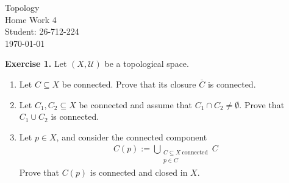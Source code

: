 \documentclass[12pt]{article}
\begin{document}
\begin{titlepage}
\centering
\vspace*{\fill} %
{\Huge Topology} \\[0.5cm] %
{\Huge Home Work 4}\\[1.5cm] %
{\Large Student: 26-712-224}\\[0.5cm] %
{\Large \today} %
\vspace*{\fill}
\end{titlepage}

\newpage
\noindent
\noindent\textbf{Exercise 1.} Let $(X,\mathcal{U})$ be a topological space.
\begin{enumerate}
\item[(a)] Let $C\subseteq X$ be connected. Prove that its closure $\overline{C}$ is connected.
\item[(b)] Let $C_1,C_2\subseteq X$ be connected and assume that $C_1\cap C_2\neq\emptyset$. Prove that $C_1\cup C_2$ is connected.
\item[(c)] Let $p\in X$, and consider the connected component
\begin{align*}
C(p):=\bigcup_{\substack{C\subseteq X\ \text{connected}\\p\in C}} C \tag{1.1}
\end{align*}
Prove that $C(p)$ is connected and closed in $X$.
\end{enumerate}
\end{document}
